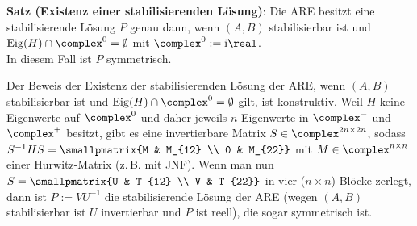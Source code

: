 \textbf{Satz (Existenz einer stabilisierenden Lösung)}:
Die ARE besitzt eine stabilisierende Lösung $P$ genau dann, wenn
$(A, B)$ stabilisierbar ist und $\Eig(H) \cap \complex^0 = \emptyset$
mit $\complex^0 := \iu\real$.\\
In diesem Fall ist $P$ symmetrisch.

Der Beweis der Existenz der stabilisierenden Lösung der ARE,
wenn $(A, B)$ stabilisierbar ist und $\Eig(H) \cap \complex^0 = \emptyset$ gilt,
ist konstruktiv.
Weil $H$ keine Eigenwerte auf $\complex^0$ und daher jeweils $n$ Eigenwerte in $\complex^-$ und
$\complex^+$ besitzt,
gibt es eine invertierbare Matrix $S \in \complex^{2n \times 2n}$, sodass
$S^{-1}HS = \smallpmatrix{M & M_{12} \\ 0 & M_{22}}$ mit $M \in \complex^{n \times n}$
einer Hurwitz-Matrix (z.\,B. mit JNF).
Wenn man nun $S = \smallpmatrix{U & T_{12} \\ V & T_{22}}$ in vier ($n \times n$)-Blöcke zerlegt,
dann ist $P := VU^{-1}$ die stabilisierende Lösung der ARE
(wegen $(A, B)$ stabilisierbar ist $U$ invertierbar und $P$ ist reell),
die sogar symmetrisch ist.

\linie
\pagebreak


